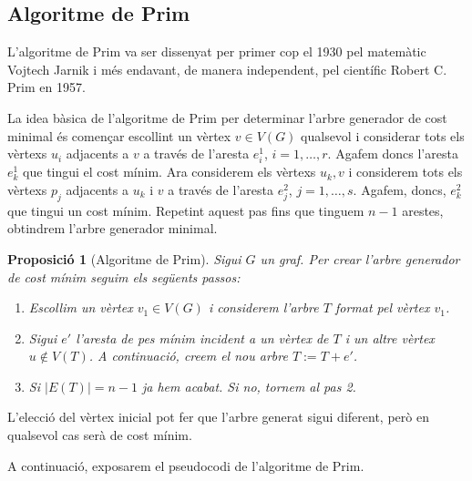 \documentclass{article}
\newtheorem{prop}{Proposició}[section]
\begin{document}
\subsection{Algoritme de Prim}
L'algoritme de Prim va ser dissenyat per primer cop el 1930 pel matemàtic Vojtech Jarnik i més endavant, de manera independent, pel científic Robert C. Prim en 1957. \cite{12}\par
La idea bàsica de l'algoritme de Prim per determinar l'arbre generador de cost minimal és començar escollint un vèrtex $v\in V(G)$ qualsevol i considerar tots els vèrtexs $u_i$ adjacents a $v$ a través de l'aresta $e_i^1$, $i=1,\ldots,r$. Agafem doncs l'aresta $e_k^1$ que tingui el cost mínim. Ara considerem els vèrtexs $u_k,v$ i considerem tots els vèrtexs $p_j$ adjacents a $u_k$ i $v$ a través de l'aresta $e_j^2$, $j=1,\ldots,s$. Agafem, doncs, $e_k^2$ que tingui un cost mínim. Repetint aquest pas fins que tinguem $n-1$ arestes, obtindrem l’arbre generador minimal.
\begin{prop}[Algoritme de Prim]
Sigui $G$ un graf. Per crear l'arbre generador de cost mínim seguim els següents passos:
\begin{enumerate}
    \item Escollim un vèrtex $v_1\in V(G)$ i considerem l’arbre $T$ format pel vèrtex $v_1$.
    \item Sigui $e'$ l’aresta de pes mínim incident a un vèrtex de $T$ i un altre vèrtex $u\notin V(T)$. A continuació, creem el nou arbre $T:=T+e'$.
    \item Si $|E(T)|=n-1$ ja hem acabat. Si no, tornem al pas 2.
\end{enumerate}
\end{prop}
L’elecció del vèrtex inicial pot fer que l’arbre generat sigui diferent, però en qualsevol cas serà de cost mínim.\par A continuació, exposarem el pseudocodi de l'algoritme de Prim.
\end{document}
